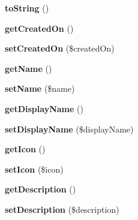 \begin{DoxyCompactItemize}
\item 
\hypertarget{class_gift_a5558c5d549f41597377fa1ea8a1cefa3}{{\bfseries to\+String} ()}\label{class_gift_a5558c5d549f41597377fa1ea8a1cefa3}

\item 
\hypertarget{class_gift_a346b90b05b25684ab3d2c62566270551}{{\bfseries get\+Created\+On} ()}\label{class_gift_a346b90b05b25684ab3d2c62566270551}

\item 
\hypertarget{class_gift_adff89ef96f7c1e0f0752caca8ccc750b}{{\bfseries set\+Created\+On} (\$created\+On)}\label{class_gift_adff89ef96f7c1e0f0752caca8ccc750b}

\item 
\hypertarget{class_gift_a3d0963e68bb313b163a73f2803c64600}{{\bfseries get\+Name} ()}\label{class_gift_a3d0963e68bb313b163a73f2803c64600}

\item 
\hypertarget{class_gift_a2fe666694997d047711d7653eca2f132}{{\bfseries set\+Name} (\$name)}\label{class_gift_a2fe666694997d047711d7653eca2f132}

\item 
\hypertarget{class_gift_a273f6220e7dea1423919139742e04902}{{\bfseries get\+Display\+Name} ()}\label{class_gift_a273f6220e7dea1423919139742e04902}

\item 
\hypertarget{class_gift_ac60edd848e67ad4f32d55a27798a2255}{{\bfseries set\+Display\+Name} (\$display\+Name)}\label{class_gift_ac60edd848e67ad4f32d55a27798a2255}

\item 
\hypertarget{class_gift_a278a55b3129c24c2077ea6093cf06f6e}{{\bfseries get\+Icon} ()}\label{class_gift_a278a55b3129c24c2077ea6093cf06f6e}

\item 
\hypertarget{class_gift_a279097e114946d07f9257f4014bd45ca}{{\bfseries set\+Icon} (\$icon)}\label{class_gift_a279097e114946d07f9257f4014bd45ca}

\item 
\hypertarget{class_gift_a2e7bb35c71bf1824456ceb944cb7a845}{{\bfseries get\+Description} ()}\label{class_gift_a2e7bb35c71bf1824456ceb944cb7a845}

\item 
\hypertarget{class_gift_a31fad3e39336ea079ea758e051866627}{{\bfseries set\+Description} (\$description)}\label{class_gift_a31fad3e39336ea079ea758e051866627}


\end{DoxyCompactItemize}
